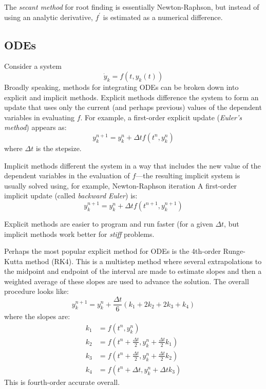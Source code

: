 The {\em secant method} for root finding is essentially
Newton-Raphson, but instead of using an analytic derivative,
$f^\prime$ is estimated as a numerical difference.


\subsection{ODEs}

Consider a system 
\begin{equation}
\dot{y}_k = f(t, y_k(t))
\end{equation}
Broadly speaking, methods for integrating ODEs can be broken down into
explicit and implicit methods.  Explicit methods difference the system
to form an update that uses only the current (and perhaps previous)
values of the dependent variables in evaluating $f$.  For example, a
first-order explicit update ({\em Euler's method}) appears as:
\begin{equation}
y^{n+1}_k = y^n_k + \Delta t f(t^n, y^n_k)
\end{equation}
where $\Delta t$ is the stepsize. 

Implicit methods different the system in a way that includes the new
value of the dependent variables in the evaluation of $f$---the resulting
implicit system is usually solved using, for example, Newton-Raphson iteration
A first-order implicit update (called {\em backward Euler}) is:
\begin{equation}
y^{n+1}_k = y^n_k + \Delta t f(t^{n+1}, y^{n+1}_k)
\end{equation}

Explicit methods are easier to program and run faster (for a given $
\Delta t$, but implicit methods work better for {\em stiff} problems.

Perhaps the most popular explicit method for ODEs is the 4th-order
Runge-Kutta method (RK4).  This is a multistep method where several
extrapolations to the midpoint and endpoint of the interval are
made to estimate slopes and then a weighted average of these slopes
are used to advance the solution.  The overall procedure looks like:
\begin{equation}
y_k^{n+1} = y_k^n + \frac{\Delta t}{6} (k_1 + 2 k_2 + 2 k_3 + k_4)
\end{equation}
where the slopes are:
\begin{align}
k_1 &= f(t^n, y_k^n) \\
k_2 &= f(t^n + \tfrac{\Delta t}{2}, y_k^n + \tfrac{\Delta t}{2} k_1) \\
k_3 &= f(t^n + \tfrac{\Delta t}{2}, y_k^n + \tfrac{\Delta t}{2} k_2) \\
k_4 &= f(t^n + \Delta t, y_k^n + \Delta t k_3)
\end{align}
This is fourth-order accurate overall.

